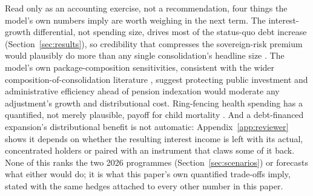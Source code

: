 \documentclass[11pt,a4paper]{article}
\begin{document}
Read only as an accounting exercise, not a recommendation, four things the model's own numbers imply are worth weighing in the next term. The interest-growth differential, not spending size, drives most of the status-quo debt increase (Section~\ref{sec:results}), so credibility that compresses the sovereign-risk premium would plausibly do more than any single consolidation's headline size \citep{blanchard2019,furmansummers2020}. The model's own package-composition sensitivities, consistent with the wider composition-of-consolidation literature \citep{alesinaardagna2010,pires2014}, suggest protecting public investment and administrative efficiency ahead of pension indexation would moderate any adjustment's growth and distributional cost. Ring-fencing health spending has a quantified, not merely plausible, payoff for child mortality \citep{szkloclarkerocha2024,rasellaetal2013}. And a debt-financed expansion's distributional benefit is not automatic: Appendix~\ref{app:reviewer} shows it depends on whether the resulting interest income is left with its actual, concentrated holders \citep{lustig2018ceq,higginspereira2014} or paired with an instrument that claws some of it back. None of this ranks the two 2026 programmes (Section~\ref{sec:scenarios}) or forecasts what either would do; it is what this paper's own quantified trade-offs imply, stated with the same hedges attached to every other number in this paper.

\end{document}
